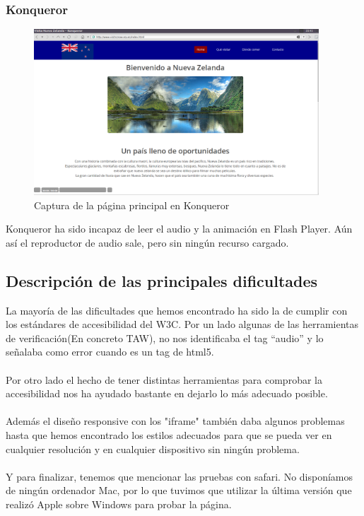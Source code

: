 \subsubsection{Konqueror}
\begin{figure}[h]
	\centering
	\includegraphics[width=0.95\textwidth]{./Fotos/konqueror-capture.png}
	\caption{Captura de la página principal en Konqueror}
	\label{fig: ejemplo}
\end{figure}
Konqueror ha sido incapaz de leer el audio y la animación en Flash Player. Aún así el reproductor de audio sale, pero sin ningún recurso cargado.
\subsection{Descripción de las principales dificultades}
La mayoría de las dificultades que hemos encontrado ha sido la de cumplir con los estándares de accesibilidad del W3C. Por un lado algunas de las herramientas de verificación(En concreto TAW), no nos identificaba el tag ``audio'' y lo señalaba como error cuando es un tag de html5. \\ \\
Por otro lado el hecho de tener distintas herramientas para comprobar la accesibilidad nos ha ayudado bastante en dejarlo lo más adecuado posible. \\ \\
Además el diseño responsive con los "iframe" también daba algunos problemas hasta que hemos encontrado los estilos adecuados para que se pueda ver en cualquier resolución y en cualquier dispositivo sin ningún problema.
\\ \\Y para finalizar, tenemos que mencionar las pruebas con safari. No disponíamos de ningún ordenador Mac, por lo que tuvimos que utilizar la última versión que realizó Apple sobre Windows para probar la página.
